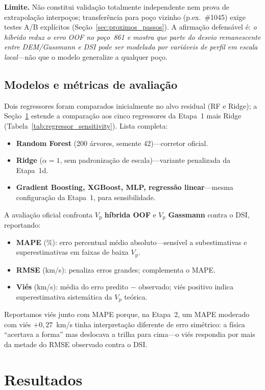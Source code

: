 \documentclass[11pt,a4paper]{article}
\numberwithin{equation}{section}
\newcommand{\Vp}{\ensuremath{V_{\mathrm{p}}}}
\begin{document}
\textbf{Limite.} Não constitui validação totalmente independente nem prova de
extrapolação interpoços; transferência para poço vizinho (p.ex.\ \#1045)
exige testes A/B explícitos (Seção~\ref{sec:proximos_passos}).
A afirmação defensável é:
\emph{o híbrido reduz o erro OOF no poço~861 e mostra que parte do desvio
remanescente entre DEM/Gassmann e DSI pode ser modelada por variáveis de perfil
em escala local}---não que o modelo generalize a qualquer poço.

\subsection{Modelos e métricas de avaliação}

Dois regressores foram comparados inicialmente no alvo residual (RF e Ridge);
a Seção~\ref{sec:resultados} estende a comparação aos cinco
regressores da Etapa~1 mais Ridge (Tabela~\ref{tab:regressor_sensitivity}).
Lista completa:
\begin{itemize}
  \item \textbf{Random Forest} (200 árvores, semente 42)---corretor oficial.
  \item \textbf{Ridge} ($\alpha = 1$, sem padronização de escala)---variante
        penalizada da Etapa~1d.
  \item \textbf{Gradient Boosting, XGBoost, MLP, regressão linear}---mesma
        configuração da Etapa~1, para sensibilidade.
\end{itemize}

A avaliação oficial confronta \Vp{} \textbf{híbrida OOF} e \Vp{}
\textbf{Gassmann} contra o DSI, reportando:
\begin{itemize}
  \item \textbf{MAPE} (\%): erro percentual médio absoluto---sensível a
        subestimativas e superestimativas em faixas de baixa \Vp{}.
  \item \textbf{RMSE} (km/s): penaliza erros grandes; complementa o MAPE.
  \item \textbf{Viés} (km/s): média do erro predito $-$ observado; viés
        positivo indica superestimativa sistemática da \Vp{} teórica.
\end{itemize}
Reportamos viés junto com MAPE porque, na Etapa~2, um MAPE moderado com viés
$+0{,}27$~km/s tinha interpretação diferente de erro simétrico: a física
``acertava a forma'' mas deslocava a trilha para cima---o viés respondia por
mais da metade do RMSE observado contra o DSI.

\section{Resultados}
\label{sec:resultados}
\end{document}
